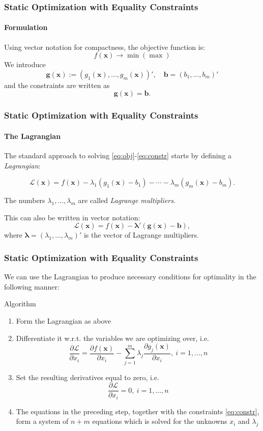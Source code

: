 \documentclass[10pt]{beamer}
\theoremstyle{definition}
\begin{document}
\begin{frame}[fragile]
\frametitle{Static Optimization with Equality Constraints}
\framesubtitle{Formulation}
Using vector notation for compactness, the objective function is:
\[ f(\mathbf{x}) \rightarrow \min (\max) \]
We introduce
\[ \mathbf{g}(\mathbf{x}):= (g_1(\mathbf{x}),\ldots,g_m(\mathbf{x}))',\quad \mathbf{b} = (b_1,\ldots,b_m)' \]
and the constraints are written as 
\[ \mathbf{g}(\mathbf{x})=\mathbf{b}. \]
\end{frame}

\begin{frame}[fragile]
\frametitle{Static Optimization with Equality Constraints}
\framesubtitle{The Lagrangian}
The standard approach to solving \eqref{eq:obj}-\eqref{eq:constr} starts by defining a \emph{Lagrangian}:

\[ \mathcal{L}(\mathbf{x}) = f(\mathbf{x}) - \lambda_1 (g_1(\mathbf{x})-b_1) - \cdots - \lambda_m (g_m(\mathbf{x})-b_m). \]\bigskip

The numbers $ \lambda_1,\ldots,\lambda_m $ are called \emph{Lagrange multipliers}.\bigskip

This can also be written in vector notation:
\[ \mathcal{L}(\mathbf{x}) = f(\mathbf{x}) - \boldsymbol{\lambda}' (\mathbf{g}(\mathbf{x})-\mathbf{b}) , \] 
where $ \boldsymbol{\lambda }= (\lambda_1,\ldots,\lambda_m)' $ is the vector of Lagrange multipliers.
\end{frame}

\begin{frame}[fragile]
\frametitle{Static Optimization with Equality Constraints}
We can use the Lagrangian to produce necessary conditions for optimality in the following manner:

\begin{block}{Algorithm}
\begin{enumerate}
\item Form the Lagrangian as above
\item Differentiate it w.r.t. the variables we are optimizing over, i.e.
\[ \dfrac{\partial \mathcal{L}}{\partial x_i} = \dfrac{\partial f(\mathbf{x})}{\partial x_i} - \sum_{j=1}^{m}\lambda_j \dfrac{\partial g_j(\mathbf{x})}{\partial x_i},~i=1,\ldots,n \]
\item Set the resulting derivatives equal to zero, i.e.
\[ \dfrac{\partial \mathcal{L}}{\partial x_i} = 0,~i=1,\ldots,n \]
\item The equations in the preceding step, together with the constraints \eqref{eq:constr}, form a system of $ n+m $ equations which is solved for the unknowns $ x_i $ and $ \lambda_j $
\end{enumerate}
\end{block}
\end{frame}
\end{document}
